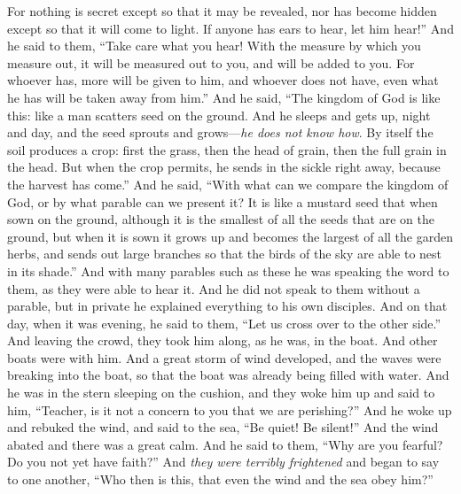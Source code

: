 \begin{biblechapter}
\verse For nothing is secret except so that it may be revealed, nor has become hidden except so that it will come to light.
\verse If anyone has ears to hear, let him hear!”
\verse And he said to them, “Take care what you hear! With the measure by which you measure out, it will be measured out to you, and will be added to you.
\verse For whoever has, more will be given to him, and whoever does not have, even what he has will be taken away from him.”
 And he said, “The kingdom of God is like this: like a man scatters seed on the ground.
\verse And he sleeps and gets up, night and day, and the seed sprouts and grows—\textit{he does not know how}.
\verse By itself the soil produces a crop: first the grass, then the head of grain, then the full grain in the head.
\verse But when the crop permits, he sends in the sickle right away, because the harvest has come.”
 And he said, “With what can we compare the kingdom of God, or by what parable can we present it?
\verse It is like a mustard seed that when sown on the ground, although it is the smallest of all the seeds that are on the ground,
\verse but when it is sown it grows up and becomes the largest of all the garden herbs, and sends out large branches so that the birds of the sky are able to nest in its shade.”
\verse And with many parables such as these he was speaking the word to them, as they were able to hear it.
\verse And he did not speak to them without a parable, but in private he explained everything to his own disciples.
 And on that day, when it was evening, he said to them, “Let us cross over to the other side.”
\verse And leaving the crowd, they took him along, as he was, in the boat. And other boats were with him.
\verse And a great storm of wind developed, and the waves were breaking into the boat, so that the boat was already being filled with water.
\verse And he was in the stern sleeping on the cushion, and they woke him up and said to him, “Teacher, is it not a concern to you that we are perishing?”
\verse And he woke up and rebuked the wind, and said to the sea, “Be quiet! Be silent!” And the wind abated and there was a great calm.
\verse And he said to them, “Why are you fearful? Do you not yet have faith?”
\verse And \textit{they were terribly frightened} and began to say to one another, “Who then is this, that even the wind and the sea obey him?”
\end{biblechapter}

